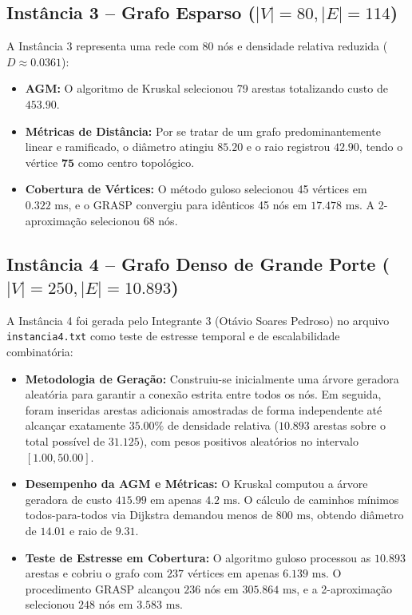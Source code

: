 \documentclass[12pt,a4paper]{article}
\begin{document}
\subsection{Instância 3 -- Grafo Esparso ($|V|=80, |E|=114$)}
A Instância 3 representa uma rede com 80 nós e densidade relativa reduzida ($D \approx 0.0361$):
\begin{itemize}
    \item \textbf{AGM:} O algoritmo de Kruskal selecionou 79 arestas totalizando custo de $\mathbf{453.90}$.
    \item \textbf{Métricas de Distância:} Por se tratar de um grafo predominantemente linear e ramificado, o diâmetro atingiu $\mathbf{85.20}$ e o raio registrou $\mathbf{42.90}$, tendo o vértice $\mathbf{75}$ como centro topológico.
    \item \textbf{Cobertura de Vértices:} O método guloso selecionou 45 vértices em $0.322\text{ ms}$, e o GRASP convergiu para idênticos 45 nós em $17.478\text{ ms}$. A 2-aproximação selecionou 68 nós.
\end{itemize}

\subsection{Instância 4 -- Grafo Denso de Grande Porte ($|V|=250, |E|=10.893$)}
A Instância 4 foi gerada pelo Integrante 3 (Otávio Soares Pedroso) no arquivo \texttt{instancia4.txt} como teste de estresse temporal e de escalabilidade combinatória:
\begin{itemize}
    \item \textbf{Metodologia de Geração:} Construiu-se inicialmente uma árvore geradora aleatória para garantir a conexão estrita entre todos os nós. Em seguida, foram inseridas arestas adicionais amostradas de forma independente até alcançar exatamente $\mathbf{35.00\%}$ de densidade relativa ($10.893$ arestas sobre o total possível de $31.125$), com pesos positivos aleatórios no intervalo $[1.00, 50.00]$.
    \item \textbf{Desempenho da AGM e Métricas:} O Kruskal computou a árvore geradora de custo $\mathbf{415.99}$ em apenas $4.2\text{ ms}$. O cálculo de caminhos mínimos todos-para-todos via Dijkstra demandou menos de $800\text{ ms}$, obtendo diâmetro de $\mathbf{14.01}$ e raio de $\mathbf{9.31}$.
    \item \textbf{Teste de Estresse em Cobertura:} O algoritmo guloso processou as $10.893$ arestas e cobriu o grafo com $237$ vértices em apenas $6.139\text{ ms}$. O procedimento GRASP alcançou $236$ nós em $305.864\text{ ms}$, e a 2-aproximação selecionou $248$ nós em $3.583\text{ ms}$.
\end{itemize}
\end{document}

